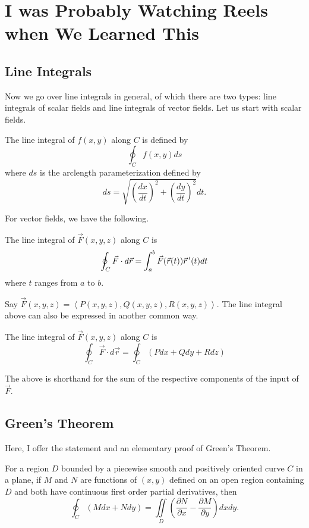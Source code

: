 \chapter{I was Probably Watching Reels when We Learned This}

\section{Line Integrals}

Now we go over line integrals in general, of which there are two types: line integrals of scalar fields and line integrals of vector fields. Let us start with scalar fields.

\begin{definition}
    The line integral of $f(x, y)$ along $C$ is defined by
    \[\oint_{C}f(x, y)ds\]
    where $ds$ is the arclength parameterization defined by
    \[ds = \sqrt{\left(\frac{dx}{dt}\right)^{2} + \left(\frac{dy}{dt}\right)^{2}}dt.\]
\end{definition}

For vector fields, we have the following.

\begin{definition}
    The line integral of $\vec{F}(x, y, z)$ along $C$ is
    \[\oint_{C}\vec{F} \cdot d\vec{r} = \int_{a}^{b}\vec{F}(\vec{r}(t))\vec{r}\,^{\prime}(t)dt\]
    where $t$ ranges from $a$ to $b$.
\end{definition}

Say $\vec{F}(x, y, z) = \left<P(x, y, z), Q(x, y, z), R(x, y, z)\right>$. The line integral above can also be expressed in another common way.

\begin{corollary}
    The line integral of $\vec{F}(x, y, z)$ along $C$ is
    \[\oint_{C}\vec{F} \cdot d\vec{r} = \oint_{C}\left(Pdx + Qdy + Rdz\right)\]
\end{corollary}

The above is shorthand for the sum of the respective components of the input of $\vec{F}$.

\section{Green's Theorem}

Here, I offer the statement and an elementary proof of Green's Theorem.

\begin{theorem}
    For a region $D$ bounded by a piecewise smooth and positively oriented curve $C$ in a plane, if $M$ and $N$ are functions of $(x, y)$ defined on an open region containing $D$ and both have continuous first order partial derivatives, then
    \[\oint_{C}(Mdx + Ndy) = \iint\limits_{D}\left(\frac{\partial N}{\partial x} - \frac{\partial M}{\partial y}\right)dxdy.\]
\end{theorem}

